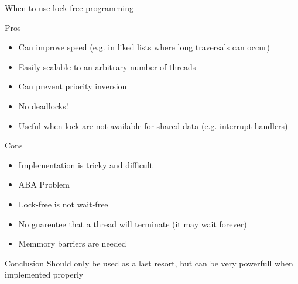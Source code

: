 \begin{frame}[allowframebreaks]{When to use lock-free programming}
    \begin{block}{Pros}
    \begin{itemize}
        \item Can improve speed (e.g. in liked lists where long traversals can occur)
        \item Easily \textcolor{ReneOrange}{scalable} to an arbitrary number of threads
        \item Can prevent priority inversion
        \item \textcolor{ReneOrange}{No deadlocks!}
        \item Useful when lock are not available for shared data (e.g. interrupt handlers)
    \end{itemize}
    \end{block}  
    
    \begin{block}{Cons}
    \begin{itemize}
        \item Implementation is tricky and difficult
        \item ABA Problem
        \item Lock-free is \textcolor{ReneOrange}{not wait-free}
        \item No guarentee that a thread will terminate (it may wait forever)
        \item \textcolor{ReneOrange}{Memmory barriers} are needed
    \end{itemize}
    \end{block}   
    
    \begin{exampleblock}{Conclusion}
        Should only be used as a last resort, but can be very powerfull when implemented properly
    \end{exampleblock}
\end{frame}
